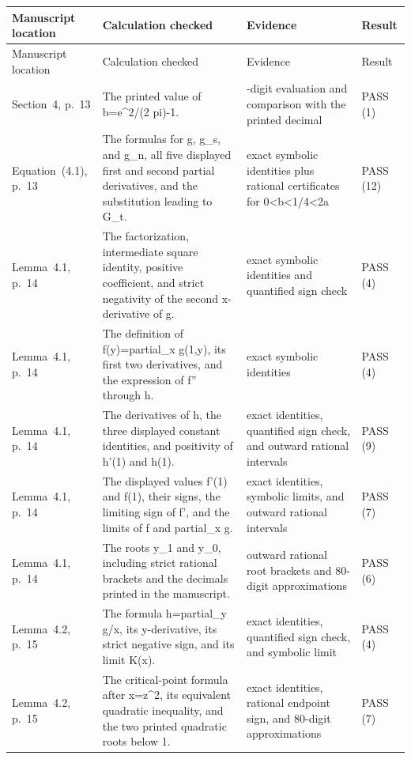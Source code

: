 {\footnotesize
\setlength{\tabcolsep}{2pt}
\begin{longtable}{@{}>{\raggedright\arraybackslash}p{30mm}>{\raggedright\arraybackslash}p{64mm}>{\raggedright\arraybackslash}p{44mm}>{\raggedright\arraybackslash}p{16mm}@{}}
\toprule
Manuscript location & Calculation checked & Evidence & Result \\
\midrule\endfirsthead
\toprule
Manuscript location & Calculation checked & Evidence & Result \\
\midrule\endhead
\bottomrule\endfoot
Section~4, p.~13 & The printed value of b=e\textasciicircum{}2/(2 pi)-1. & 80-digit evaluation and comparison with the printed decimal & PASS (1) \\
Equation~(4.1), p.~13 & The formulas for g, g\_s, and g\_n, all five displayed first and second partial derivatives, and the substitution leading to G\_t. & exact symbolic identities plus rational certificates for 0<b<1/4<2a & PASS (12) \\
Lemma~4.1, p.~14 & The factorization, intermediate square identity, positive coefficient, and strict negativity of the second x-derivative of g. & exact symbolic identities and quantified sign check & PASS (4) \\
Lemma~4.1, p.~14 & The definition of f(y)=partial\_x g(1,y), its first two derivatives, and the expression of f'' through h. & exact symbolic identities & PASS (4) \\
Lemma~4.1, p.~14 & The derivatives of h, the three displayed constant identities, and positivity of h'(1) and h(1). & exact identities, quantified sign check, and outward rational intervals & PASS (9) \\
Lemma~4.1, p.~14 & The displayed values f'(1) and f(1), their signs, the limiting sign of f', and the limits of f and partial\_x g. & exact identities, symbolic limits, and outward rational intervals & PASS (7) \\
Lemma~4.1, p.~14 & The roots y\_1 and y\_0, including strict rational brackets and the decimals printed in the manuscript. & outward rational root brackets and 80-digit approximations & PASS (6) \\
Lemma~4.2, p.~15 & The formula h=partial\_y g/x, its y-derivative, its strict negative sign, and its limit K(x). & exact identities, quantified sign check, and symbolic limit & PASS (4) \\
Lemma~4.2, p.~15 & The critical-point formula after x=z\textasciicircum{}2, its equivalent quadratic inequality, and the two printed quadratic roots below 1. & exact identities, rational endpoint sign, and 80-digit approximations & PASS (7) \\

\end{longtable}}
